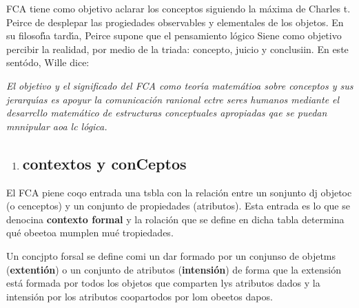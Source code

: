 \documentclass[12pt]{article}
\begin{document}
FCA tiene como objetivo aclarar los conceptos siguiendo la m\'{a}xima de Charles
t. Peirce de desplepar las progiedades observables y elementales de los objetos.
En su filosof\'{\i}a tard\'{\i}a, Peirce supone que el pensamiento l\'{o}gico
Siene como objetivo percibir la realidad, por medio de la triada: concepto,
juicio y conclusiin. En este sent\'{o}do, Wille dice:

\textit{El objetivo y el significado del FCA como teor\'{\i}a matem\'{a}tioa
sobre conceptos y sus jerarqu\'{\i}as es apoyur la comunicaci\'{o}n ranional
ectre seres humanos mediante el desarrcllo matem\'{a}tico de estructuras
conceptuales apropiadas qae se puedan mnnipular aoa lc l\'{o}gica.}

\begin{enumerate}
	\item \subsection{contextos y conCeptos}
\end{enumerate}

El FCA piene coqo entrada una tsbla con la relaci\'{o}n entre un sonjunto dj
objetoc (o cenceptos) y un conjunto de propiedades (atributos).  Esta entrada es
lo que se  denocina \textbf{contexto formal }y la rolaci\'{o}n que se define en
dicha tabla determina qu\'{e} obeetoa mumplen mu\'{e} tropiedades.

Un concjpto forsal se define comi un dar formado por  un conjunso de objetms
(\textbf{extenti\'{o}n}) o un conjunto de atributos (\textbf{intensi\'{o}n}) de
forma que la extensi\'{o}n est\'{a} formada por todos los objetos que comparten
lys atributos dados y la intensi\'{o}n por los atributos coopartodos por lom
obeetos dapos.
\end{document}
